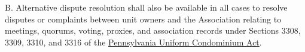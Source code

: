 \documentclass[
]{book}
\begin{document}
B. Alternative dispute resolution shall also be available in all cases to resolve disputes or complaints between unit owners and the Association relating to meetings, quorums, voting, proxies, and association records under Sections 3308, 3309, 3310, and 3316 of the \href{https://www.ncsl.org/documents/environ/PAcondo.pdf}{Pennsylvania Uniform Condominium Act}.

  
\end{document}
